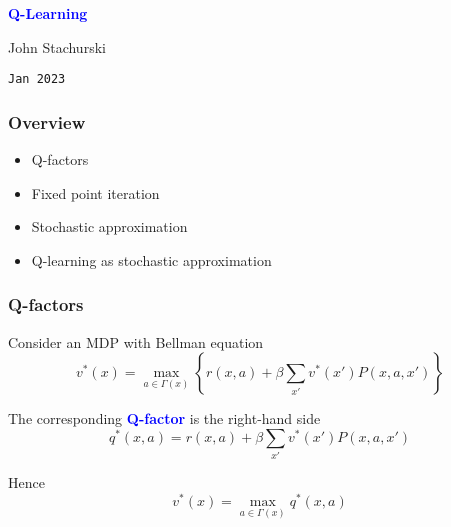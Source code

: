 \documentclass[xcolor=dvipsnames]{beamer}  %
\newcommand{\navy}[1]{\textcolor{blue}{\bf #1}}
\newcommand{\1}{\mathbbm 1}
\begin{document}


\begin{frame}
    
    \begin{center}
        \navy{\Large{Q-Learning}}

        
        \vspace{2em}
        John Stachurski 

        \vspace{1em}
        \vspace{1em}
        \texttt{Jan 2023}

    \end{center}

\end{frame}

\begin{frame}
    \frametitle{Overview}
    
    \begin{itemize}
        \item Q-factors
            \vspace{0.5em}
        \item Fixed point iteration
            \vspace{0.5em}
        \item Stochastic approximation
            \vspace{0.5em}
        \item Q-learning as stochastic approximation
    \end{itemize}

\end{frame}


\begin{frame}
    \frametitle{Q-factors}

    Consider an MDP with Bellman equation
    \begin{equation*}
        v^*(x) = \max_{a \in \Gamma(x)}
        \left\{
            r(x,a) + \beta \sum_{x'} v^*(x') P(x,a,x')
        \right\}
    \end{equation*}

    \vspace{0.5em}
    \vspace{0.5em}
    The corresponding \navy{Q-factor} is the right-hand side
    \begin{equation*}
        q^*(x,a) = r(x,a) + \beta \sum_{x'} v^*(x') P(x,a,x')
    \end{equation*}

    Hence
    \begin{equation*}
        v^*(x)  = \max_{a \in \Gamma(x)} q^*(x,a)
    \end{equation*}

\end{frame}
\end{document}
